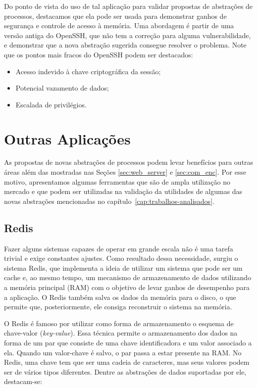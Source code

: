 Do ponto de vista do uso de tal aplicação para validar propostas de abstrações
de processos, destacamos que ela pode ser usada para demonstrar ganhos de
segurança e controle de acesso à memória. Uma abordagem é partir de uma versão
antiga do OpenSSH, que não tem a correção para alguma vulnerabilidade, e
demonstrar que a nova abstração sugerida consegue resolver o problema. Note que
os pontos mais fracos do OpenSSH podem ser destacados:

\begin{itemize}
  \item Acesso indevido à chave criptográfica da sessão;
  \item Potencial vazamento de dados;
  \item Escalada de privilégios.
\end{itemize}

\section{Outras Aplicações}

As propostas de novas abstrações de processos podem levar benefícios para
outras áreas além das mostradas nas Seções \ref{sec:web_server} e
\ref{sec:com_enc}. Por esse motivo, apresentamos algumas ferramentas que são de
ampla utilização no mercado e que podem ser utilizadas na validação da
utilidades de algumas das novas abstrações mencionadas no
capítulo~\ref{cap:trabalhos-analisados}.

\subsection{Redis}

Fazer alguns sistemas capazes de operar em grande escala não é uma tarefa trivial e exige constantes
ajustes. Como resultado dessa necessidade, surgiu o sistema Redis, que
implementa a ideia de utilizar um sistema que pode ser um cache e, ao mesmo tempo,
um mecanismo de armazenamento de dados utilizando a memória principal (RAM) com o objetivo
de levar ganhos de desempenho para a aplicação. O Redis também salva os dados
da memória para o disco, o que permite que, posteriormente, ele consiga
reconstruir o sistema na memória.

O Redis é famoso por utilizar como forma de armazenamento o esquema de
chave-valor (\emph{key-value}). Essa técnica permite o armazenamento dos dados na
forma de um par que consiste de uma chave identificadora e um valor associado a
ela. Quando um valor-chave é salvo, o par passa a estar presente na
RAM. No Redis, uma chave tem que ser uma cadeia de caracteres, mas seus valores podem ser de
vários tipos diferentes. Dentre as abstrações de dados suportadas por ele, destacam-se:

